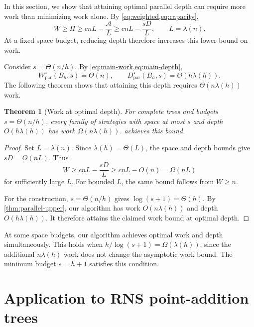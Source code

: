 \documentclass[11pt]{article}
\newtheorem{theorem}{Theorem}[section]
\theoremstyle{definition}
\theoremstyle{remark}
\newcommand{\Area}{\mathcal A}
\newcommand{\Wpar}{W_{\mathrm{par}}}
\newcommand{\Dpar}{D_{\mathrm{par}}}
\begin{document}
In this section, we show that attaining optimal parallel depth
can require more work than minimizing work alone.
By \cref{eq:weighted,eq:capacity},
\begin{equation}
W\ge\Pi\ge cnL-\frac{\Area}{L}\ge cnL-\frac{sD}{L}, \qquad L=\lambda(n).
\end{equation}
At a fixed space budget, reducing depth therefore increases
this lower bound on work.

Consider $s=\Theta(n/h)$. By
\cref{eq:main-work,eq:main-depth},
\begin{equation}
\Wpar^\star(B_h,s)=\Theta(n), \qquad \Dpar^\star(B_h,s)=\Theta(h\lambda(h)).
\end{equation}
The following theorem shows that attaining this depth
requires $\Theta(n\lambda(h))$ work.

\begin{theorem}[Work at optimal depth]
\label{thm:separation}
For complete trees and budgets $s=\Theta(n/h)$, every family
of strategies with space at most $s$ and depth
$O(h\lambda(h))$ has work $\Omega(n\lambda(h))$.
 achieves this bound.
\end{theorem}

\begin{proof}
Set $L=\lambda(n)$. Since $\lambda(h)=\Theta(L)$,
the space and depth bounds give $sD=O(nL)$.
Thus
\begin{equation}
W\ge cnL-\frac{sD}{L}\ge cnL-O(n)=\Omega(nL)
\end{equation}
for sufficiently large $L$.
For bounded $L$, the same bound follows from $W\ge n$.

For the construction, $s=\Theta(n/h)$ gives
$\log(s+1)=\Theta(h)$.
By \cref{thm:parallel-upper}, our algorithm has work
$O(n\lambda(h))$ and depth $O(h\lambda(h))$.
It therefore attains the claimed work bound at optimal depth.
\end{proof}

At some space budgets, our algorithm achieves optimal work
and depth simultaneously. This holds when
$h/\log(s+1)=\Omega(\lambda(h))$, since the additional
$n\lambda(h)$ work does not change the asymptotic work bound.
The minimum budget $s=h+1$ satisfies this condition.
\section{Application to RNS point-addition trees}
\label{sec:cfs-case-study}
\end{document}
